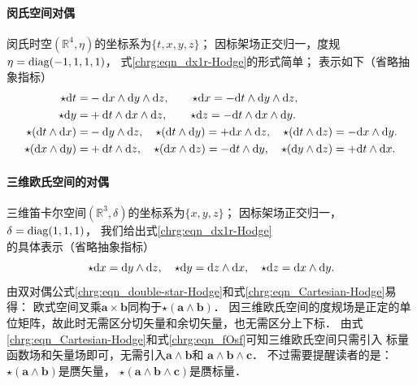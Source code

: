 \paragraph{闵氏空间对偶} %
闵氏时空$(\mathbb{R}^4,\eta)$的坐标系为$\{t,x,y,z\}$；
因标架场正交归一，度规$\eta={\rm diag}(-1,1,1,1)$，
式\eqref{chrg:eqn_dx1r-Hodge}的形式简单；
表示如下（省略抽象指标）
\begin{align*}
    \star  {\rm d}t =& -{\rm d}x \wedge {\rm d}y \wedge {\rm d}z , \qquad
    \star  {\rm d}x =  -{\rm d}t \wedge {\rm d}y \wedge {\rm d}z , \\
    \star  {\rm d}y =& +{\rm d}t \wedge {\rm d}x \wedge {\rm d}z , \qquad
    \star  {\rm d}z =  -{\rm d}t \wedge {\rm d}x \wedge {\rm d}y . \\
    \star  ({\rm d}t \wedge {\rm d}x) =&- {\rm d}y \wedge {\rm d}z, \quad
    \star  ({\rm d}t \wedge {\rm d}y) = + {\rm d}x \wedge {\rm d}z, \quad
    \star  ({\rm d}t \wedge {\rm d}z) = - {\rm d}x \wedge {\rm d}y. \\
    \star  ({\rm d}x \wedge {\rm d}y) =&+ {\rm d}t \wedge {\rm d}z, \quad
    \star  ({\rm d}x \wedge {\rm d}z) = - {\rm d}t \wedge {\rm d}y, \quad
    \star  ({\rm d}y \wedge {\rm d}z) = + {\rm d}t \wedge {\rm d}x.
\end{align*}


\paragraph{三维欧氏空间的对偶}
三维笛卡尔空间$(\mathbb{R}^3,\delta)$的坐标系为$\{x,y,z\}$；
因标架场正交归一，$\delta={\rm diag}(1,1,1)$，
我们给出式\eqref{chrg:eqn_dx1r-Hodge}的具体表示（省略抽象指标）
\begin{equation}\label{chrg:eqn_Cartesian-Hodge}
    \star  {\rm d}x = {\rm d}y \wedge {\rm d}z, \quad
    \star  {\rm d}y = {\rm d}z \wedge {\rm d}x, \quad
    \star  {\rm d}z = {\rm d}x \wedge {\rm d}y.
\end{equation}
由双对偶公式\eqref{chrg:eqn_double-star-Hodge}和式\eqref{chrg:eqn_Cartesian-Hodge}易得：
欧式空间叉乘$\boldsymbol{a}\times \boldsymbol{b}$同构于$\star (\boldsymbol{a}\wedge \boldsymbol{b})$．
因三维欧氏空间的度规场是正定的单位矩阵，故此时无需区分切矢量和余切矢量，也无需区分上下标．
由式\eqref{chrg:eqn_Cartesian-Hodge}和式\eqref{chrg:eqn_fOsf}可知三维欧氏空间只需引入
标量函数场和矢量场即可，无需引入$\boldsymbol{a}\wedge \boldsymbol{b}$和
$\boldsymbol{a}\wedge \boldsymbol{b}\wedge \boldsymbol{c}$．
不过需要提醒读者的是：$\star (\boldsymbol{a}\wedge \boldsymbol{b})$是赝矢量，
$\star (\boldsymbol{a}\wedge \boldsymbol{b}\wedge \boldsymbol{c})$是赝标量．

